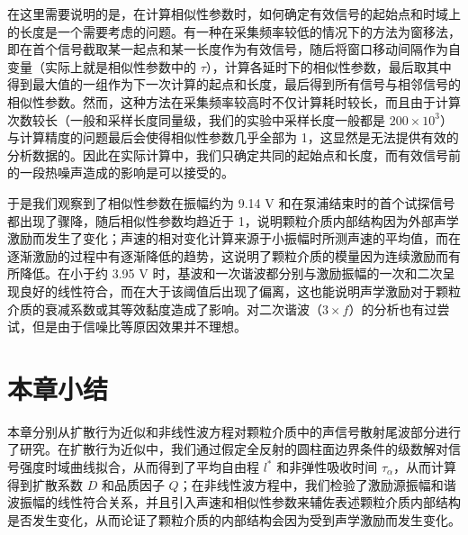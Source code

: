 在这里需要说明的是，在计算相似性参数时，如何确定有效信号的起始点和时域上的长度是一个需要考虑的问题。有一种在采集频率较低的情况下的方法为窗移法，即在首个信号截取某一起点和某一长度作为有效信号，随后将窗口移动间隔作为自变量（实际上就是相似性参数中的 $\tau$），计算各延时下的相似性参数，最后取其中得到最大值的一组作为下一次计算的起点和长度，最后得到所有信号与相邻信号的相似性参数。然而，这种方法在采集频率较高时不仅计算耗时较长，而且由于计算次数较长（一般和采样长度同量级，我们的实验中采样长度一般都是 $200\times 10^{3}$）与计算精度的问题最后会使得相似性参数几乎全部为 1，这显然是无法提供有效的分析数据的。因此在实际计算中，我们只确定共同的起始点和长度，而有效信号前的一段热噪声造成的影响是可以接受的。

于是我们观察到了相似性参数在振幅约为 9.14 \unit{\volt} 和在泵浦结束时的首个试探信号都出现了骤降，随后相似性参数均趋近于 1，说明颗粒介质内部结构因为外部声学激励而发生了变化；声速的相对变化计算来源于小振幅时所测声速的平均值，而在逐渐激励的过程中有逐渐降低的趋势，这说明了颗粒介质的模量因为连续激励而有所降低。在小于约 3.95 \unit{\volt} 时，基波和一次谐波都分别与激励振幅的一次和二次呈现良好的线性符合，而在大于该阈值后出现了偏离，这也能说明声学激励对于颗粒介质的衰减系数或其等效黏度造成了影响。对二次谐波（$3\times f$）的分析也有过尝试，但是由于信噪比等原因效果并不理想。

\section{本章小结}

本章分别从扩散行为近似和非线性波方程对颗粒介质中的声信号散射尾波部分进行了研究。在扩散行为近似中，我们通过假定全反射的圆柱面边界条件的级数解对信号强度时域曲线拟合，从而得到了平均自由程 $l^{*}$ 和非弹性吸收时间 $\tau_{\alpha}$，从而计算得到扩散系数 $D$ 和品质因子 $Q$；在非线性波方程中，我们检验了激励源振幅和谐波振幅的线性符合关系，并且引入声速和相似性参数来辅佐表述颗粒介质内部结构是否发生变化，从而论证了颗粒介质的内部结构会因为受到声学激励而发生变化。